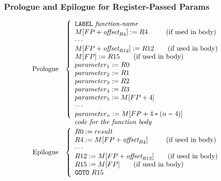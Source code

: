 \documentclass{beamer}
\begin{document}
\begin{frame}
\frametitle{Prologue and Epilogue for Register-Passed Params}

\renewcommand{\arraystretch}{0.85}

\[\begin{array}{rl}
\mbox{Prologue} & \left\{
{\begin{array}{l}
{\tt LABEL}~\mbox{\it function-name} \\
M[FP+\mbox{\it offset}_{R4}] := R4 ~~~~~~~~\mbox{(if used in body)} \\
\cdots \\
M[FP+\mbox{\it offset}_{R12}] := R12 ~~~~~~\mbox{(if used in body)} \\
M[FP] := R15 ~~~~~~\mbox{(if used in body)} \\
parameter_1 := R0\\
parameter_2 := R1\\
parameter_3 := R2\\
parameter_4 := R3\\
parameter_5 := M[FP+4] \\
\cdots \\
parameter_n := M[FP+4*(n-4)]
\end{array}}
\right. \\[0.5ex]

& ~~~~\mbox{\it code for the function body} \\[0.5ex]

\mbox{Epilogue} & \left\{
{\begin{array}{l}
R0 := result \\
R4 := M[FP+\mbox{\it offset}_{R4}] ~~~~~~~~\mbox{(if used in body)}  \\
\cdots \\
R12 := M[FP+\mbox{\it offset}_{R12}] ~~~~~~\mbox{(if used in body)} \\
R15 := M[FP] ~~~~~~\mbox{(if used in body)} \\
{\tt GOTO}~R15
\end{array}}
\right.
\end{array}\]

\end{frame}
\end{document}
